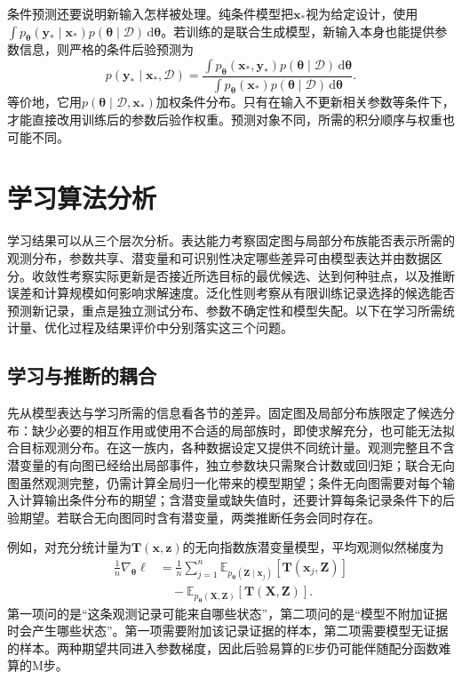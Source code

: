 条件预测还要说明新输入怎样被处理。纯条件模型把$\bm{x}_*$视为给定设计，使用$\int p_{\bm{\theta}}(\bm{y}_*\mid\bm{x}_*)p(\bm{\theta}\mid\mathcal{D})\,\mathrm{d}\bm{\theta}$。若训练的是联合生成模型，新输入本身也能提供参数信息，则严格的条件后验预测为
\[
  p(\bm{y}_*\mid\bm{x}_*,\mathcal{D})
  =\frac{\int p_{\bm{\theta}}(\bm{x}_*,\bm{y}_*)
                      p(\bm{\theta}\mid\mathcal{D})\,\mathrm{d}\bm{\theta}}
         {\int p_{\bm{\theta}}(\bm{x}_*)
                      p(\bm{\theta}\mid\mathcal{D})\,\mathrm{d}\bm{\theta}}.
\]
等价地，它用$p(\bm{\theta}\mid\mathcal{D},\bm{x}_*)$加权条件分布。只有在输入不更新相关参数等条件下，才能直接改用训练后的参数后验作权重。预测对象不同，所需的积分顺序与权重也可能不同。

\section{学习算法分析}
\label{sec:pgm-parameter-learning-analysis}

学习结果可以从三个层次分析。表达能力考察固定图与局部分布族能否表示所需的观测分布，参数共享、潜变量和可识别性决定哪些差异可由模型表达并由数据区分。收敛性考察实际更新是否接近所选目标的最优候选、达到何种驻点，以及推断误差和计算规模如何影响求解速度。泛化性则考察从有限训练记录选择的候选能否预测新记录，重点是独立测试分布、参数不确定性和模型失配。以下在学习所需统计量、优化过程及结果评价中分别落实这三个问题。

\subsection{学习与推断的耦合}
\label{sec:pgm-parameter-learning-inference-coupling}

先从模型表达与学习所需的信息看各节的差异。固定图及局部分布族限定了候选分布：缺少必要的相互作用或使用不合适的局部族时，即使求解充分，也可能无法拟合目标观测分布。在这一族内，各种数据设定又提供不同统计量。观测完整且不含潜变量的有向图已经给出局部事件，独立参数块只需聚合计数或回归矩；联合无向图虽然观测完整，仍需计算全局归一化带来的模型期望；条件无向图需要对每个输入计算输出条件分布的期望；含潜变量或缺失值时，还要计算每条记录条件下的后验期望。若联合无向图同时含有潜变量，两类推断任务会同时存在。

例如，对充分统计量为$\bm{T}(\bm{x},\bm{z})$的无向指数族潜变量模型，平均观测似然梯度为
\begin{equation}
  \begin{aligned}
    \frac{1}{n}\nabla_{\bm{\theta}}\ell
      &=\frac{1}{n}\sum_{j=1}^n
        \mathbb{E}_{p_{\bm{\theta}}(\bm{Z}\mid\bm{x}_j)}
          [\bm{T}(\bm{x}_j,\bm{Z})]\\
      &\quad-\mathbb{E}_{p_{\bm{\theta}}(\bm{X},\bm{Z})}
          [\bm{T}(\bm{X},\bm{Z})].
  \end{aligned}
  \label{eq:pgm-parameter-learning-two-expectations}
\end{equation}
第一项问的是“这条观测记录可能来自哪些状态”，第二项问的是“模型不附加证据时会产生哪些状态”。第一项需要附加该记录证据的样本，第二项需要模型无证据的样本。两种期望共同进入参数梯度，因此后验易算的E步仍可能伴随配分函数难算的M步。

